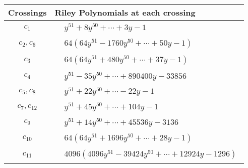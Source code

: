 \documentclass[1p]{elsarticle_modified}
\theoremstyle{definition}
\begin{document}
\begin{tabular}{m{50pt}|m{274pt}}
Crossings & \hspace{64pt}Riley Polynomials at each crossing \\
\hline $$\begin{aligned}c_{1}\end{aligned}$$&$\begin{aligned}
&y^{51}+8 y^{50}+\cdots+3 y-1
\end{aligned}$\\
\hline $$\begin{aligned}c_{2},c_{6}\end{aligned}$$&$\begin{aligned}
&64(64 y^{51}-1760 y^{50}+\cdots+50 y-1)
\end{aligned}$\\
\hline $$\begin{aligned}c_{3}\end{aligned}$$&$\begin{aligned}
&64(64 y^{51}+480 y^{50}+\cdots+37 y-1)
\end{aligned}$\\
\hline $$\begin{aligned}c_{4}\end{aligned}$$&$\begin{aligned}
&y^{51}-35 y^{50}+\cdots+890400 y-33856
\end{aligned}$\\
\hline $$\begin{aligned}c_{5},c_{8}\end{aligned}$$&$\begin{aligned}
&y^{51}+22 y^{50}+\cdots-22 y-1
\end{aligned}$\\
\hline $$\begin{aligned}c_{7},c_{12}\end{aligned}$$&$\begin{aligned}
&y^{51}+45 y^{50}+\cdots+104 y-1
\end{aligned}$\\
\hline $$\begin{aligned}c_{9}\end{aligned}$$&$\begin{aligned}
&y^{51}+14 y^{50}+\cdots+45536 y-3136
\end{aligned}$\\
\hline $$\begin{aligned}c_{10}\end{aligned}$$&$\begin{aligned}
&64(64 y^{51}+1696 y^{50}+\cdots+28 y-1)
\end{aligned}$\\
\hline $$\begin{aligned}c_{11}\end{aligned}$$&$\begin{aligned}
&4096(4096 y^{51}-39424 y^{50}+\cdots+12924 y-1296)
\end{aligned}$\\
\hline
\end{tabular}\\~\\
\end{document}
